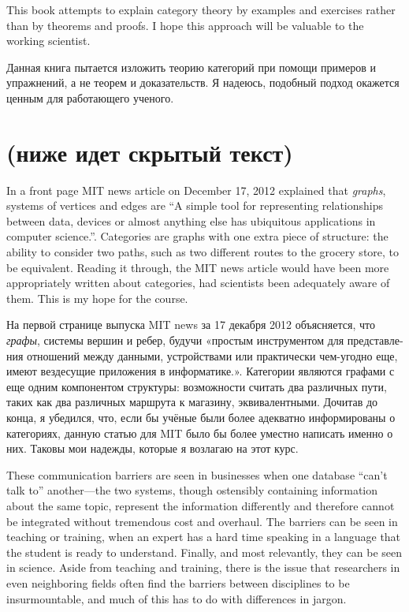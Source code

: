 \documentclass[a4paper]{book}
\theoremstyle{myth}
\begin{document}
\begin{russian}
This book attempts to explain category theory by examples and exercises rather than by theorems and proofs. I hope this approach will be valuable to the working scientist.

Данная книга пытается изложить теорию категорий при помощи примеров и упражнений, а не теорем и доказательств. Я надеюсь, подобный подход окажется ценным для работающего ученого. 


\section{(ниже идет скрытый текст)}

In a front page MIT news article on December 17, 2012 explained that {\em graphs}, systems of vertices and edges are “A simple tool for representing relationships between data, devices or almost anything else has ubiquitous applications in computer science.”\cite{http://web.mit.edu/newsoffice/2012/explained-graphs-computer-science-1217.html}. Categories are graphs with one extra piece of structure: the ability to consider two paths, such as two different routes to the grocery store, to be equivalent. Reading it through, the MIT news article would have been more appropriately written about categories, had scientists been adequately aware of them. This is my hope for the course.

На первой странице выпуска MIT news за 17 декабря 2012 объясняется, что {\em графы}, системы вершин и ребер, будучи «простым инструментом для представления отношений между данными, устройствами или практически чем-угодно еще, имеют вездесущие приложения в информатике.»\cite{http://web.mit.edu/newsoffice/2012/explained-graphs-computer-science-1217.html}. Категории являются графами с еще одним компонентом структуры: возможности считать два различных пути, таких как два различных маршрута к магазину, эквивалентными. Дочитав до конца, я убедился, что, если бы учёные были более адекватно информированы о категориях, данную статью для MIT было бы более уместно написать именно о них. Таковы мои надежды, которые я возлагаю на этот курс. 

These communication barriers are seen in businesses when one database “can't talk to” another---the two systems, though ostensibly containing information about the same topic, represent the information differently and therefore cannot be integrated without tremendous cost and overhaul. The barriers can be seen in teaching or training, when an expert has a hard time speaking in a language that the student is ready to understand. Finally, and most relevantly, they can be seen in science. Aside from teaching and training, there is the issue that researchers in even neighboring fields often find the barriers between disciplines to be insurmountable, and much of this has to do with differences in jargon.


\end{russian}
\end{document}
